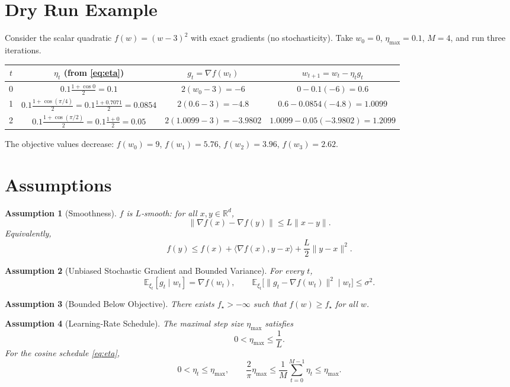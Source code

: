 \documentclass{article}
\newtheorem{assumption}{Assumption}
\newcommand{\E}{\mathbb{E}}
\newcommand{\R}{\mathbb{R}}
\begin{document}
\section*{Dry Run Example}
Consider the scalar quadratic $f(w)=(w-3)^2$ with exact gradients (no stochasticity).  
Take $w_0=0$, $\eta_{\max}=0.1$, $M=4$, and run three iterations.

\begin{center}
\begin{tabular}{c|c|c|c}
$t$ & $\eta_t$ (from \eqref{eq:eta}) & $g_t=\nabla f(w_t)$ & $w_{t+1}=w_t-\eta_t g_t$\\ \hline
0 & $0.1\frac{1+\cos0}{2}=0.1$ & $2(w_0-3)=-6$ & $0-0.1(-6)=0.6$ \\
1 & $0.1\frac{1+\cos(\pi/4)}{2}=0.1\frac{1+0.7071}{2}=0.0854$ & $2(0.6-3)=-4.8$ & $0.6-0.0854(-4.8)=1.0099$\\
2 & $0.1\frac{1+\cos(\pi/2)}{2}=0.1\frac{1+0}{2}=0.05$ & $2(1.0099-3)=-3.9802$ & $1.0099-0.05(-3.9802)=1.2099$
\end{tabular}
\end{center}
The objective values decrease:
$f(w_0)=9$, $f(w_1)=5.76$, $f(w_2)=3.96$, $f(w_3)=2.62$.

\section*{Assumptions}
\begin{assumption}[Smoothness]
\label{ass:smooth}
$f$ is $L$‑smooth: for all $x,y\in\R^d$,
\[
\|\nabla f(x)-\nabla f(y)\|\le L\|x-y\|.
\]
Equivalently,
\[
f(y)\le f(x)+\langle\nabla f(x),y-x\rangle+\frac{L}{2}\|y-x\|^2 .
\]
\end{assumption}

\begin{assumption}[Unbiased Stochastic Gradient and Bounded Variance]
\label{ass:unbiased}
For every $t$, 
\[
\E_{\xi_t}[g_t\mid w_t]=\nabla f(w_t),\qquad
\E_{\xi_t}\big[\|g_t-\nabla f(w_t)\|^2\mid w_t\big]\le\sigma^2 .
\]
\end{assumption}

\begin{assumption}[Bounded Below Objective]
\label{ass:lower}
There exists $f_\star>-\infty$ such that $f(w)\ge f_\star$ for all $w$.
\end{assumption}

\begin{assumption}[Learning‑Rate Schedule]
\label{ass:schedule}
The maximal step size $\eta_{\max}$ satisfies
\[
0<\eta_{\max}\le \frac{1}{L}.
\]
For the cosine schedule \eqref{eq:eta},
\[
0<\eta_t\le \eta_{\max},\qquad
\frac{2}{\pi}\eta_{\max}\le\frac1M\sum_{t=0}^{M-1}\eta_t\le\eta_{\max}.
\]
\end{assumption}
\end{document}
